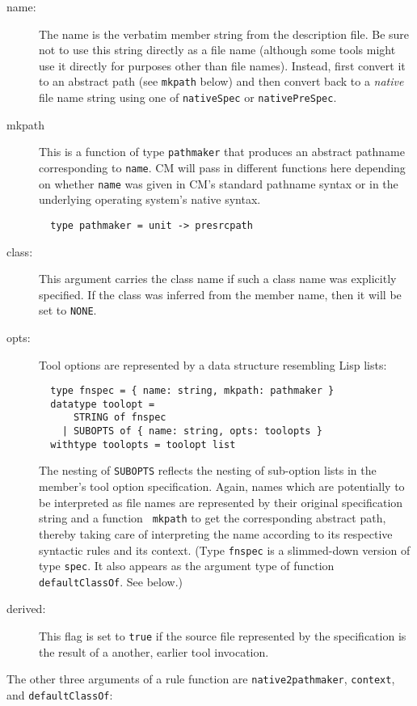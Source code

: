\begin{description}
\item[name:] The name is the verbatim member string from the
description file.  Be sure not to use this string directly as a file
name (although some tools might use it directly for purposes other
than file names).  Instead, first convert it to an abstract path (see
{\tt mkpath} below) and then convert back to a {\em native} file name
string using one of {\tt nativeSpec} or {\tt nativePreSpec}.
\item[mkpath] This is a function of type {\tt pathmaker} that produces
an abstract pathname corresponding to {\tt name}.  CM will pass in different
functions here depending on whether {\tt name} was given in CM's
standard pathname syntax or in the underlying operating system's
native syntax.
\begin{verbatim}
  type pathmaker = unit -> presrcpath
\end{verbatim}
\item[class:] This argument carries the class name if such a class
name was explicitly specified.  If the class was inferred from the
member name, then it will be set to {\tt NONE}.
\item[opts:] Tool options are represented by a data structure
resembling Lisp lists:
\begin{verbatim}
  type fnspec = { name: string, mkpath: pathmaker }
  datatype toolopt =
      STRING of fnspec
    | SUBOPTS of { name: string, opts: toolopts }
  withtype toolopts = toolopt list
\end{verbatim}
The nesting of {\tt SUBOPTS} reflects the nesting of sub-option lists
in the member's tool option specification.
Again, names which are potentially to be interpreted as file names are
represented by their original specification string and a function {\tt
mkpath} to get the corresponding abstract path, thereby taking
care of interpreting the name according to its respective syntactic
rules and its context. (Type {\tt fnspec} is a slimmed-down version of
type {\tt spec}.  It also appears as the argument type of function
{\tt defaultClassOf}.  See below.)
\item[derived:] This flag is set to {\tt true} if the source file
represented by the specification is the result of a another, earlier
tool invocation.
\end{description}

The other three arguments of a rule function are {\tt native2pathmaker},
{\tt context}, and {\tt defaultClassOf}:

